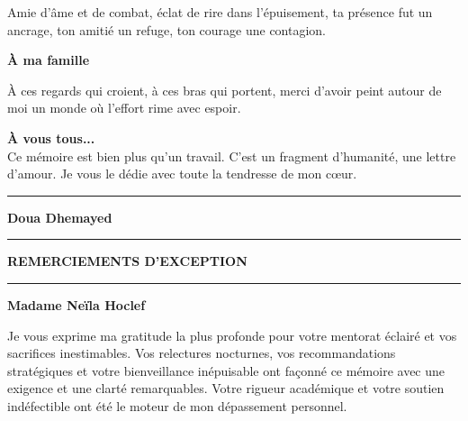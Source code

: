 \documentclass[a4paper,11pt]{report}
\begin{document}
\vspace{0.3cm}

\noindent
Amie d’âme et de combat, éclat de rire dans l’épuisement,
ta présence fut un ancrage, ton amitié un refuge,
ton courage une contagion.

\vspace{0.5cm}

\begin{center}
    \textbf{\Large À ma famille}
\end{center}

\vspace{0.3cm}

\noindent
À ces regards qui croient, à ces bras qui portent,
merci d’avoir peint autour de moi un monde
où l’effort rime avec espoir.

\vspace{0.5cm}

\begin{center}
    \textbf{\large À vous tous...}\\[0.3cm]
    Ce mémoire est bien plus qu’un travail.
    C’est un fragment d’humanité, une lettre d’amour.
    Je vous le dédie avec toute la tendresse de mon cœur.
\end{center}

\vspace{0.5cm}
\noindent\rule{\linewidth}{0.4pt}
\vspace{0.2cm}
\noindent\textbf{Doua Dhemayed}


\vspace*{1cm}
\thispagestyle{empty}

\begin{center}
    \rule{\linewidth}{0.5pt}
    \vspace{0.5cm}

    {\LARGE \textbf{REMERCIEMENTS D’EXCEPTION}}

    \vspace{0.5cm}
    \rule{\linewidth}{0.5pt}
\end{center}

\vspace{0.5cm}

\begin{center}
    \textbf{\Large Madame Neïla Hoclef}
\end{center}

\vspace{0.3cm}

\noindent
Je vous exprime ma gratitude la plus profonde pour votre mentorat éclairé et vos sacrifices inestimables. Vos relectures nocturnes, vos recommandations stratégiques et votre bienveillance inépuisable ont façonné ce mémoire avec une exigence et une clarté remarquables. Votre rigueur académique et votre soutien indéfectible ont été le moteur de mon dépassement personnel.
\end{document}
